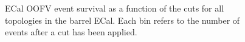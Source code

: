 \begin{figure}
\begin{minipage}{.5\linewidth}
\end{minipage}%
\begin{minipage}{.5\linewidth}
\centering
{}
\end{minipage}\par\medskip
\caption{ECal OOFV event survival as a function of the cuts for all topologies in the barrel ECal.  Each bin refers to the number of events after a cut has been applied.}
\label{fig:SelOOFVEventSurvivalBarrel}
\end{figure}

